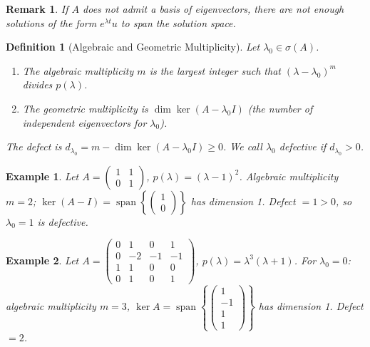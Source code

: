 \documentclass{article}
\newtheorem{definition}{Definition}
\newtheorem*{example}{Example}
\newtheorem{remark}{Remark}
\begin{document}
\begin{remark}
    If $A$ does not admit a basis of eigenvectors, there are not 
    enough solutions of the form $e^{\lambda t}u$ to span the 
    solution space.
\end{remark}

\begin{definition}[Algebraic and Geometric Multiplicity]
    Let $\lambda_0 \in \sigma(A)$.
    \begin{enumerate}
        \item The \emph{algebraic multiplicity} $m$ is the largest 
        integer such that $(\lambda - \lambda_0)^m$ divides 
        $p(\lambda)$.
        \item The \emph{geometric multiplicity} is 
        $\dim\ker(A - \lambda_0 I)$ (the number of independent 
        eigenvectors for $\lambda_0$).
    \end{enumerate}
    The \emph{defect} is $d_{\lambda_0} = m - \dim\ker(A-\lambda_0 I) 
    \geq 0$. We call $\lambda_0$ \emph{defective} if 
    $d_{\lambda_0} > 0$.
\end{definition}

\begin{example}
    Let $A = \begin{pmatrix}1&1\\0&1\end{pmatrix}$, 
    $p(\lambda) = (\lambda-1)^2$. Algebraic multiplicity $m=2$; 
    $\ker(A-I) = \operatorname{span}\!\left\{
    \begin{pmatrix}1\\0\end{pmatrix}\right\}$ has dimension 1. 
    Defect $= 1 > 0$, so $\lambda_0 = 1$ is defective.
\end{example}

\begin{example}
    Let $A = \begin{pmatrix}0&1&0&1\\0&-2&-1&-1\\1&1&0&0\\
    0&1&0&1\end{pmatrix}$, $p(\lambda) = \lambda^3(\lambda+1)$. 
    For $\lambda_0 = 0$: algebraic multiplicity $m=3$, 
    $\ker A = \operatorname{span}\!\left\{
    \begin{pmatrix}1\\-1\\1\\1\end{pmatrix}\right\}$ has dimension 1. 
    Defect $= 2$.
\end{example}
\end{document}
